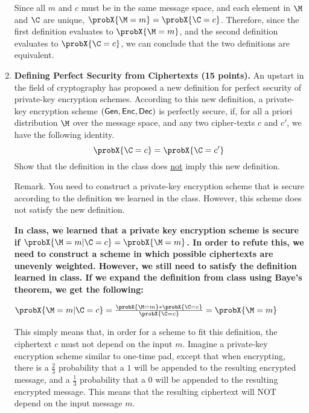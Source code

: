 \documentclass[11pt]{article}
\begin{document}
\begin{enumerate}
{    Since all $m$ and $c$ must be in the same message space, and each element in $\M$ and $\C$ are unique, $\probX{\M=m} = \probX{\C=c}$. Therefore, since the first definition evaluates to $\probX{\M=m}$, and the second definition evaluates to $\probX{\C=c}$, we can conclude that the two definitions are equivalent.
    }
     \newpage


\item {\bfseries Defining Perfect Security from Ciphertexts (15 points).} An upstart in the field of cryptography has proposed a new definition for perfect security of private-key encryption schemes. 
According to this new definition, a private-key encryption scheme $(\mathsf{Gen},\mathsf{Enc},\mathsf{Dec})$ is perfectly secure, if, for all a priori distribution $\M$ over the message space, and any two cipher-texts $c$ and $c'$, we have the following identity. 
$$\probX{\C=c} = \probX{\C=c'}$$
Show that the definition in the class does \ul{not} imply this new definition.  

{\footnotesize Remark. 
You need to construct a private-key encryption scheme that is secure according to the definition we learned in the class. 
However, this scheme does not satisfy the new definition.}
    {\bfseries
    \newline
    \newline
    In class, we learned that a private key encryption scheme is secure if $\probX{\M=m \vert \C=c} = \probX{\M=m}$. In order to refute this, we need to construct a scheme in which possible ciphertexts are unevenly weighted. However, we still need to satisfy the definition learned in class. If we expand the definition from class using Baye's theorem, we get the following: \newline

    $\probX{\M=m \vert \C=c} = \frac{\probX{\M=m}*\probX{\C=c}}{\probX{\C=c}} = \probX{\M=m}$ \newline

    This simply means that, in order for a scheme to fit this definition, the ciphertext $c$ must not depend on the input $m$. Imagine a private-key encryption scheme similar to one-time pad, except that when encrypting, there is a $\frac23$ probability that a $1$ will be appended to the resulting encrypted message, and a $\frac13$ probability that a $0$ will be appended to the resulting encrypted message. This means that the resulting ciphertext will NOT depend on the input message $m$.

}
\end{enumerate}
\end{document}
